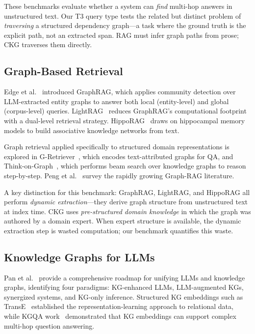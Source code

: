 These benchmarks evaluate whether a system can \textit{find} multi-hop
answers in unstructured text. Our T3 query type tests the related but
distinct problem of \textit{traversing} a structured dependency graph---a
task where the ground truth is the explicit path, not an extracted span.
RAG must infer graph paths from prose; CKG traverses them directly.

\subsection{Graph-Based Retrieval}\label{sec:rw-graphrag}

Edge et al.~\cite{edge2024graphrag} introduced GraphRAG, which applies
community detection over LLM-extracted entity graphs to answer both local
(entity-level) and global (corpus-level) queries. LightRAG~\cite{guo2024lightrag}
reduces GraphRAG's computational footprint with a dual-level retrieval
strategy. HippoRAG~\cite{gutierrez2024hipporag} draws on hippocampal memory
models to build associative knowledge networks from text.

Graph retrieval applied specifically to structured domain representations is
explored in G-Retriever~\cite{he2024gretriever}, which encodes text-attributed
graphs for QA, and Think-on-Graph~\cite{sun2024thinkongraph}, which performs
beam search over knowledge graphs to reason step-by-step. Peng et
al.~\cite{peng2024graphrag2} survey the rapidly growing Graph-RAG literature.

A key distinction for this benchmark: GraphRAG, LightRAG, and HippoRAG all
perform \textit{dynamic extraction}---they derive graph structure from
unstructured text at index time. CKG uses \textit{pre-structured domain
knowledge} in which the graph was authored by a domain expert. When expert
structure is available, the dynamic extraction step is wasted computation;
our benchmark quantifies this waste.

\subsection{Knowledge Graphs for LLMs}\label{sec:rw-kg}

Pan et al.~\cite{pan2024unifying} provide a comprehensive roadmap for
unifying LLMs and knowledge graphs, identifying four paradigms: KG-enhanced
LLMs, LLM-augmented KGs, synergized systems, and KG-only inference.
Structured KG embeddings such as TransE~\cite{bordes2013transe} established
the representation-learning approach to relational data, while KGQA
work~\cite{saxena2020kgqa} demonstrated that KG embeddings can support
complex multi-hop question answering.

